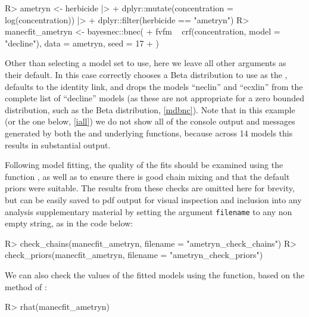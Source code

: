 \documentclass[
  shortnames]{jss}
\begin{document}
\begin{CodeChunk}
\begin{CodeInput}
R> ametryn <- herbicide |>
+   dplyr::mutate(concentration = log(concentration)) |> 
+   dplyr::filter(herbicide == "ametryn")
R> manecfit_ametryn <- bayesnec::bnec(
+   fvfm ~ crf(concentration, model = "decline"), data = ametryn, seed = 17
+ )
\end{CodeInput}
\end{CodeChunk}

Other than selecting a model set to use, here we leave all other  arguments as their default. In this case  correctly chooses a Beta distribution to use as the , defaults to the identity link, and drops the models ``neclin'' and ``ecxlin'' from the complete list of ``decline'' models (as these are not appropriate for a zero bounded distribution, such as the Beta distribution, \ref{mdbnc}). Note that in this example (or the one below, \ref{iall}) we do not show all of the console output and messages generated by both the  and underlying  functions, because across 14 models this results in substantial output.

Following model fitting, the quality of the fits should be examined using the function , as well as  to ensure there is good chain mixing and that the default priors were suitable. The results from these checks are omitted here for brevity, but can be easily saved to pdf output for visual inspection and inclusion into any analysis supplementary material by setting the argument \texttt{filename} to any non empty string, as in the code below:

\begin{CodeChunk}
\begin{CodeInput}
R> check_chains(manecfit_ametryn, filename = "ametryn_check_chains")
R> check_priors(manecfit_ametryn, filename = "ametryn_check_priors")
\end{CodeInput}
\end{CodeChunk}

We can also check the  values of the fitted models using the  function, based on the method of \citet{vehtari2021rank}:

\begin{CodeChunk}
\begin{CodeInput}
R> rhat(manecfit_ametryn)
\end{CodeInput}
\end{CodeChunk}
\end{document}
